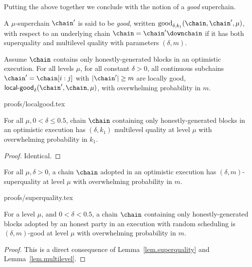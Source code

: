 Putting the above together we conclude with the notion of a {\em good} superchain.

\begin{definition}\label{lem.good} A $\mu$-superchain $\chain'$
is said to be \textit{good}, written $\textnormal{good}_{\delta, k_1}(\chain,
\chain', \mu)$, with respect to an underlying chain $\chain = \chain'\downchain$
if it has both superquality and multilevel quality with parameters $(\delta,
m)$. \end{definition}

\begin{lemma}
\label{lem.localgood}
Assume $\chain$ contains only honestly-generated blocks in an optimistic
execution. For all levels $\mu$, for all constant $\delta > 0$, all continuous
subchains $\chain' = \chain[i:j]$ with $|\chain'| \geq m$ are locally good,
$\textsf{local-good}_{\delta}(\chain', \chain, \mu)$, with overwhelming
probability in $m$.
\end{lemma}
{proofs/localgood.tex}

\begin{lemma}\label{lem.multilevel}
For all $\mu, 0 < \delta \leq 0.5$, chain $\chain$ containing only
honestly-generated blocks in an optimistic execution has $(\delta, k_1)$
multilevel quality at level $\mu$ with overwhelming probability in $k_1$.
\end{lemma}
\begin{proof}
Identical.
\Qed
\end{proof}

\begin{lemma}[Superquality]
\label{lem.superquality}
For all $\mu, \delta > 0$, a chain $\chain$ adopted in an optimistic execution
has $(\delta, m)$-superquality at level $\mu$ with overwhelming probability in
$m$.
\end{lemma}
{proofs/superquality.tex}

\begin{lemma}
\label{lem.superchain-distribution}
For a level $\mu$, and $0 < \delta < 0.5$, a chain
$\chain$ containing only honestly-generated blocks adopted by an honest party in
an execution with random scheduling is $(\delta, m)$-good at level
$\mu$ with overwhelming probability in $m$.
\end{lemma}
\begin{proof}
This is a direct consequence of Lemma~\ref{lem.superquality} and
Lemma~\ref{lem.multilevel}. \Qed
\end{proof}
